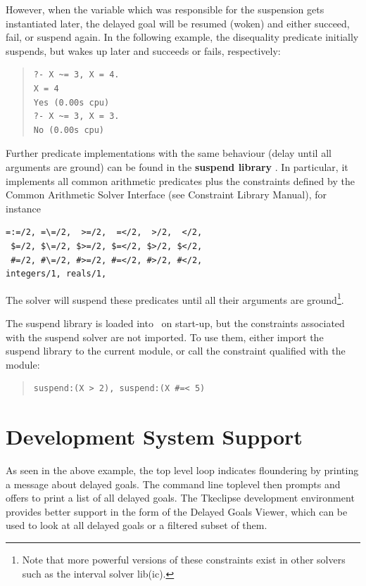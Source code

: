 However, when the variable which was responsible for the suspension gets instantiated
later, the delayed goal will be resumed (woken) and either succeed, fail, or
suspend again. In the following example, the disequality predicate initially
suspends, but wakes up later and succeeds or fails, respectively:
\begin{quote}\begin{verbatim}
?- X ~= 3, X = 4.
X = 4
Yes (0.00s cpu)
?- X ~= 3, X = 3.
No (0.00s cpu)
\end{verbatim}\end{quote}


\label{suspendsolver}
Further predicate implementations with the same behaviour (delay until
all arguments are ground) can be found in the {\bf suspend library}
.
In particular, it implements all common arithmetic predicates plus
the constraints defined by the Common Arithmetic Solver Interface
(see Constraint Library Manual), for instance
\begin{verbatim}
=:=/2, =\=/2,  >=/2,  =</2,  >/2,  </2,
 $=/2, $\=/2, $>=/2, $=</2, $>/2, $</2,
 #=/2, #\=/2, #>=/2, #=</2, #>/2, #</2,
integers/1, reals/1,
\end{verbatim}
The solver will suspend these predicates until all their arguments
are ground\footnote{
Note that more powerful versions of these constraints exist in other
solvers such as the interval solver lib(ic).
}.

The suspend library is loaded into \eclipse\ on start-up, but the
constraints associated with the suspend solver are not imported.
To use them, either import the suspend library to the current module,
or call the constraint qualified with the module:
\begin{quote}\begin{verbatim}
suspend:(X > 2), suspend:(X #=< 5)
\end{verbatim}\end{quote}



\section{Development System Support}

As seen in the above example, the  top level loop
indicates floundering by printing a message about delayed goals.
The command line toplevel then prompts and offers to print a list of
all delayed goals.
The Tkeclipse development environment provides better support in the form
of the Delayed Goals Viewer, which can be used to look at all delayed goals
or a filtered subset of them.

